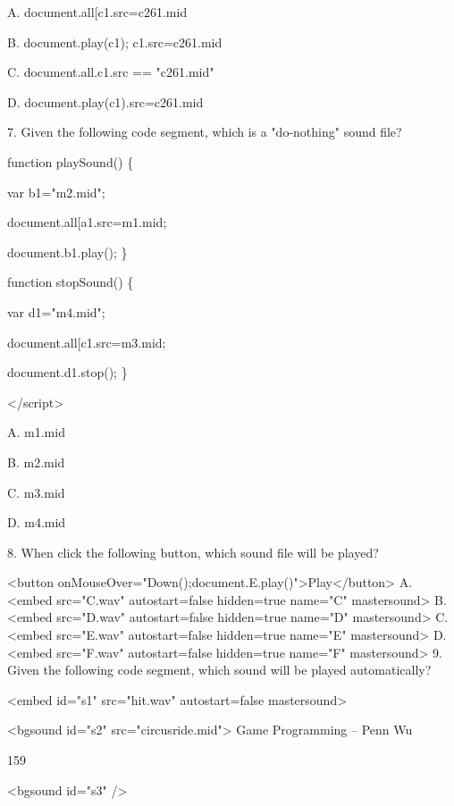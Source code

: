 \documentclass[
]{article}
\begin{document}
A.
document.all{[}\textquotesingle c1\textquotesingle{]}.src=\textquotesingle c261.mid\textquotesingle{}

B. document.play(\textquotesingle c1\textquotesingle);
c1.src=\textquotesingle c261.mid\textquotesingle{}

C. document.all.c1.src == "c261.mid"

D.
document.play(\textquotesingle c1\textquotesingle).src=\textquotesingle c261.mid\textquotesingle{}

7. Given the following code segment, which is a "do-nothing" sound file?

function playSound() \{

var b1="m2.mid";

document.all{[}\textquotesingle a1\textquotesingle{]}.src=\textquotesingle m1.mid\textquotesingle;

document.b1.play(); \}

function stopSound() \{

var d1="m4.mid";

document.all{[}\textquotesingle c1\textquotesingle{]}.src=\textquotesingle m3.mid\textquotesingle;

document.d1.stop(); \}

\textless/script\textgreater{}

A. m1.mid

B. m2.mid

C. m3.mid

D. m4.mid

8. When click the following button, which sound file will be played?

\textless button
onMouseOver="Down();document.E.play()"\textgreater Play\textless/button\textgreater{}
A. \textless embed src="C.wav" autostart=false hidden=true name="C"
mastersound\textgreater{} B. \textless embed src="D.wav" autostart=false
hidden=true name="D" mastersound\textgreater{} C. \textless embed
src="E.wav" autostart=false hidden=true name="E"
mastersound\textgreater{} D. \textless embed src="F.wav" autostart=false
hidden=true name="F" mastersound\textgreater{} 9. Given the following
code segment, which sound will be played automatically?

\textless embed id="s1" src="hit.wav" autostart=false
mastersound\textgreater{}

\textless bgsound id="s2" src="circusride.mid"\textgreater{} Game
Programming -- Penn Wu

159

\protect\hypertarget{index_split_010.htmlux5cux23p160}{}{}\textless bgsound
id="s3" /\textgreater{}
\end{document}
